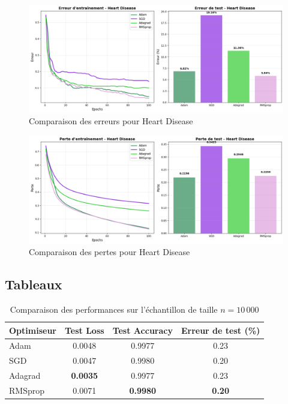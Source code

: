 \documentclass[a4paper,12pt]{article}
\begin{document}
\begin{figure}[H]
\centering
\includegraphics[width=\textwidth]{images/heart_errors.png}
\caption{Comparaison des erreurs pour Heart Disease}
\label{fig:heart_err}
\end{figure}

\begin{figure}[H]
\centering
\includegraphics[width=\textwidth]{images/heart_losses.png}
\caption{Comparaison des pertes pour Heart Disease}
\label{fig:heart_loss}
\end{figure}

\subsection{Tableaux}

\begin{table}[H]
\centering
\begin{tabular}{|l|c|c|c|}
\hline
\rowcolor{lightgray}
\textbf{Optimiseur} & \textbf{Test Loss} & \textbf{Test Accuracy} & \textbf{Erreur de test (\%)} \\
\hline
Adam      & 0.0048 & 0.9977 & 0.23 \\
\hline
SGD       & 0.0047 & 0.9980 & 0.20 \\
\hline
\rowcolor{lightgray!50}
Adagrad   & \textbf{0.0035} & 0.9977 & 0.23 \\
\hline
RMSprop   & 0.0071 & \textbf{0.9980} & \textbf{0.20} \\
\hline
\end{tabular}
\caption{Comparaison des performances sur l'échantillon de taille $n=10\,000$}
\label{tab:results_10k}
\end{table}
\end{document}
